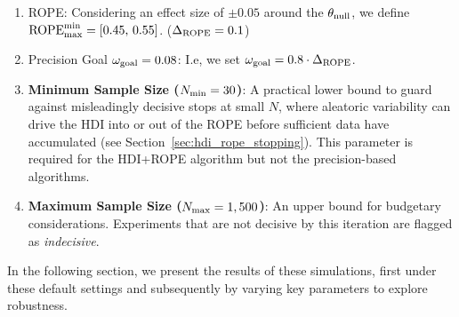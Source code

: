 \begin{enumerate}[label=(\alph*)]
    \item ROPE: Considering an effect size of $\pm 0.05$ around the $\theta_{\rm null}$, we define $\mathrm{ROPE}_{\rm max}^{\rm min}=[0.45,\,0.55]$. ($\Delta_{\rm ROPE}=0.1$)
    \item Precision Goal $\omega_{\rm goal}=0.08$: I.e, we set $\omega_{\rm goal} = 0.8 \cdot \Delta_{\rm ROPE}$.
    \item \textbf{Minimum Sample Size ($N_{\rm min}=30$)}: A practical lower bound to guard against misleadingly decisive stops at small $N$, where aleatoric variability can drive the HDI into or out of the ROPE before sufficient data have accumulated (see Section~\ref{sec:hdi_rope_stopping}).
    This parameter is required for the HDI+ROPE algorithm but not the precision-based algorithms.
    \item \textbf{Maximum Sample Size ($N_{\rm max}=1,500$)}: An upper bound for budgetary considerations. Experiments that are not decisive by this iteration are flagged as \textit{indecisive}.
\end{enumerate}

In the following section, we present the results of these simulations, first under these default settings and subsequently by varying key parameters to explore robustness.